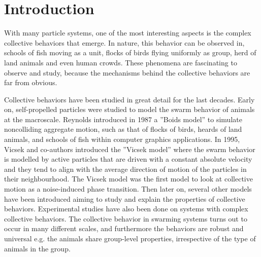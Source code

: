 \chapter{Introduction} 

With many particle systems, one of the most interesting aspects is the complex 
collective behaviors that emerge. In nature, this behavior can be observed in, 
schools of fish moving as a unit, flocks of birds flying uniformly as group, 
herd of land animals and even human crowds. These phenomena are fascinating 
to observe and study, because the mechanisms behind the collective behaviors are 
far from obvious.

Collective behaviors have been studied in great detail for the last decades. 
Early on, self-propelled particles were studied to model the swarm behavior of 
animals at the macroscale\cite{bechinger2016active}. Reynolds introduced in 1987 
a ''Boids model'' to simulate noncolliding aggregate motion, such as that of 
flocks of birds, heards of land animals, and schools of fish within computer 
graphics applications\cite{reynolds1987flocks}. In 1995, Vicsek and co-authors 
introduced the ''Vicsek model'' where the swarm behavior is modelled by active 
particles that are driven with a constant absolute velocity and they tend to 
align with the average direction of motion of the particles in their 
neighbourhood\cite{vicsek1995novel}. The Vicsek model was the first model to 
look at collective motion as a noise-induced phase transition. Then later on, 
several other models have been introduced aiming to study and explain the 
properties of collective behaviors\cite{chate2008modeling,grossmann2013self,
barberis2016large,mijalkov2016engineering, volpe2016effective,matsui2017noise,
cambui2017finite}. Experimental studies have also been done on systems with 
complex collective behaviors\cite{czirok1996formation, palacci2013living, 
theurkauff2012dynamic, ginot2015nonequilibrium, morin2017distortion}.
The collective behavior in swarming systems turns out to occur in many 
different scales, and furthermore the behaviors are robust and universal 
e.g. the animals share group-level properties, irrespective of the type of 
animals in the group\cite{buhl2006disorder}.

